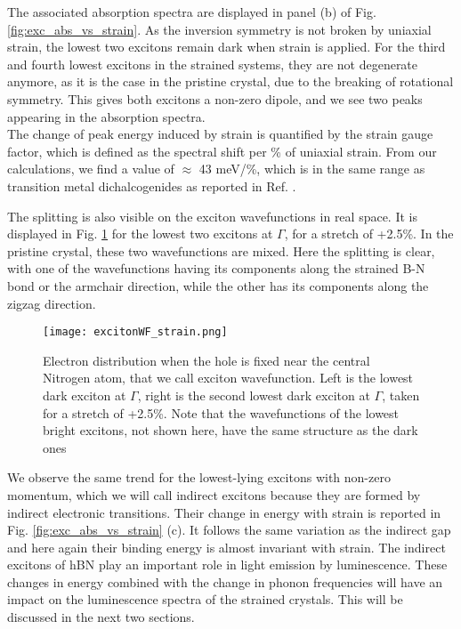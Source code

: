 The associated absorption spectra are displayed in panel (b) of Fig. \ref{fig:exc_abs_vs_strain}. As the inversion symmetry is not broken by uniaxial strain, the lowest two excitons remain dark when strain is applied. For the third and fourth lowest excitons in the strained systems, they are not degenerate anymore, as it is the case in the pristine crystal, due to the breaking of rotational symmetry. This gives both excitons a non-zero dipole, and we see two peaks appearing in the absorption spectra. \\
The change of peak energy induced by strain is quantified by the strain gauge factor, which is defined as the spectral shift per \% of uniaxial strain. From our calculations, we find a value of $\approx$ 43 meV/\%, which is in the same range as transition metal dichalcogenides as reported in Ref. \cite{carrascoso2021strain}.

The splitting is also visible on the exciton wavefunctions in real space. It is displayed in Fig. \ref{fig:excWF_strain} for the lowest two excitons at $\Gamma$, for a stretch of +2.5\%. In the pristine crystal, these two wavefunctions are mixed. Here the splitting is clear, with one of the wavefunctions having its components along the strained B-N bond or the armchair direction, while the other has its components along the zigzag direction.
\begin{figure}[tbp]
	\vspace{0.2cm}
	\setcapindent{2em}
	\centering
	\texttt{[image: excitonWF\_strain.png]}
	\caption{Electron distribution when the hole is fixed near the central Nitrogen atom, that we call exciton wavefunction. Left is the lowest dark exciton at $\Gamma$, right is the second lowest dark exciton at $\Gamma$, taken for a stretch of +2.5\%. Note that the wavefunctions of the lowest bright excitons, not shown here, have the same structure as the dark ones}
	\label{fig:excWF_strain}
\end{figure}

We observe the same trend for the lowest-lying excitons with non-zero momentum, which we will call indirect excitons because they are formed by indirect electronic transitions. Their change in energy with strain is reported in Fig. \ref{fig:exc_abs_vs_strain} (c). It follows the same variation as the indirect gap and here again their binding energy is almost invariant with strain. The indirect excitons of hBN play an important role in light emission by luminescence. These changes in energy combined with the change in phonon frequencies will have an impact on the luminescence spectra of the strained crystals. This will be discussed in the next two sections.

